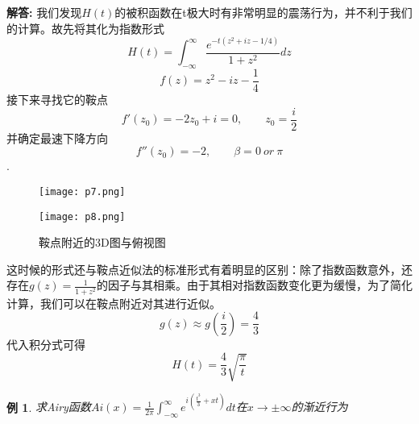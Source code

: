 \documentclass[12pt, a4paper, oneside]{ctexart}
\newenvironment{solution}
  {\par\noindent\textbf{解答:}\quad}
  {\par}
\newtheorem{example}[theorem]{例}
\begin{document}
\begin{solution}
    我们发现$H(t)$的被积函数在t极大时有非常明显的震荡行为，并不利于我们的计算。故先将其化为指数形式
    \begin{equation}
        H(t) = \int_{-\infty}^{\infty} \frac{e^{-t(z^2 +iz- 1/4)}}{1 + z^2} dz
    \end{equation}
    \begin{equation}
        f(z)=z^2-iz-\frac{1}{4}
        \end{equation}
    接下来寻找它的鞍点
    \begin{equation}
        f'(z_0)=-2z_0+i=0,\qquad z_0=\frac{i}{2}
    \end{equation}
    并确定最速下降方向
    \begin{equation}
        f''(z_0)=-2,\qquad \beta=0 \ or \ \pi
    \end{equation}
    .\\
    \begin{figure}[htbp]
        \centering
        \begin{minipage}[b]{0.48\textwidth}
            \texttt{[image: p7.png]}
            \label{fig:image1}
        \end{minipage}
        \hfill %
        \begin{minipage}[b]{0.48\textwidth}
            \texttt{[image: p8.png]}
            \label{fig:image2}
        \end{minipage}
        \caption{鞍点附近的3D图与俯视图}
        \label{fig:both_images}
        \end{figure}

    这时候的形式还与鞍点近似法的标准形式有着明显的区别：除了指数函数意外，还存在$g(z)=\frac{1}{1+z^2}$的因子与其相乘。由于其相对指数函数变化更为缓慢，为了简化计算，我们可以在鞍点附近对其进行近似。
    \begin{equation}
        g(z)\approx g(\frac{i}{2})=\frac{4}{3}
    \end{equation}
    代入积分式可得
    \begin{equation}
        H(t)=\frac{4}{3}\sqrt{\frac{\pi}{t}}
    \end{equation}
\end{solution}
\begin{example}
    求Airy函数$Ai(x)=\frac{1}{2\pi}\int_{-\infty}^{\infty}e^{i(\frac{t^3}{3}+xt)}dt$在$x\rightarrow \pm\infty$的渐近行为
\end{example}
\end{document}
